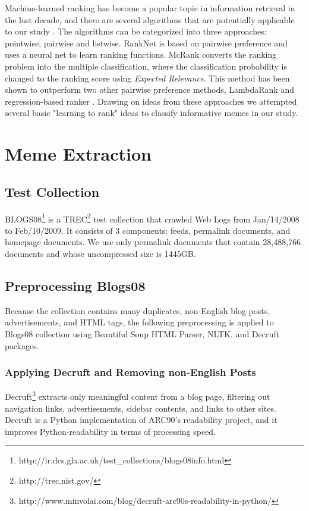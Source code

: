 \documentclass{sig-alternate}
\begin{document}
Machine-learned ranking has become a popular topic in information retrieval in the last decade, and there are several algorithms that are potentially applicable to our study \cite{Liu2011}. The algorithms can be categorized into three approaches: pointwise, pairwise and listwise. RankNet \cite{Burges2005} is based on pairwise preference and uses a neural net to learn ranking functions. McRank \cite{Li2007} converts the ranking problem into the multiple classification, where the classification probability is changed to the ranking score using \emph{Expected Relevance}. This method has been shown to outperform two other pairwise preference methods, LambdaRank \cite{Burges2007} and regression-based ranker \cite{springerlink:10.1007/11776420_44}. Drawing on ideas from these approaches we attempted several basic "learning to rank" ideas to classify informative memes in our study.

\section{Meme Extraction}

\subsection{Test Collection}

BLOGS08\footnote{http://ir.dcs.gla.ac.uk/test\_collections/blogs08info.html} is a TREC\footnote{http://trec.nist.gov/} test collection that crawled Web Logs from Jan/14/2008 to Feb/10/2009. It consists of 3 components: feeds, permalink documents, and homepage documents. We use only permalink documents that contain 28,488,766 documents and whose uncompressed size is 1445GB. 

\subsection{Preprocessing Blogs08}

Because the collection contains many duplicates, non-English blog posts, advertisements, and HTML tags, the following preprocessing is applied to Blogs08 collection using Beautiful Soup HTML Parser, NLTK, and Decruft packages.

\subsubsection{Applying Decruft and Removing non-English Posts}
Decruft\footnote{http://www.minvolai.com/blog/decruft-arc90s-readability-in-python/} extracts only meaningful content from a blog page, filtering out navigation links, advertisements, sidebar contents, and links to other sites. Decruft is a Python implementation of ARC90's readability project, and it improves Python-readability in terms of processing speed. 
\end{document}
